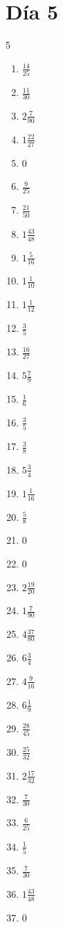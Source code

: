 \documentclass[12pt]{article}
\begin{document}
\section*{Día 5}
\begin{multicols}{5}\begin{enumerate}
\item $ \frac{14}{25} $
\item $ \frac{11}{30} $
\item $ 2 \frac{7}{90} $
\item $ 1 \frac{22}{27} $
\item $ 0 $
\item $ \frac{9}{25} $
\item $ \frac{21}{50} $
\item $ 1 \frac{43}{48} $
\item $ 1 \frac{5}{16} $
\item $ 1 \frac{1}{10} $
\item $ 1 \frac{1}{12} $
\item $ \frac{3}{5} $
\item $ \frac{16}{27} $
\item $ 5 \frac{7}{9} $
\item $ \frac{1}{6} $
\item $ \frac{3}{5} $
\item $ \frac{3}{8} $
\item $ 5 \frac{3}{4} $
\item $ 1 \frac{1}{16} $
\item $ \frac{5}{8} $
\item $ 0 $
\item $ 0 $
\item $ 2 \frac{19}{20} $
\item $ 1 \frac{7}{90} $
\item $ 4 \frac{37}{80} $
\item $ 6 \frac{3}{4} $
\item $ 4 \frac{9}{16} $
\item $ 6 \frac{1}{9} $
\item $ \frac{28}{45} $
\item $ \frac{25}{32} $
\item $ 2 \frac{17}{32} $
\item $ \frac{7}{30} $
\item $ \frac{6}{25} $
\item $ \frac{1}{5} $
\item $ \frac{7}{30} $
\item $ 1 \frac{43}{48} $
\item $ 0 $

\end{enumerate}
\end{multicols}
\end{document}
